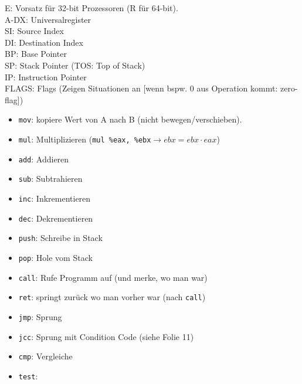 
E: Vorsatz für 32-bit Prozessoren (R für 64-bit).\\
A-DX: Universalregister\\
SI: Source Index\\
DI: Destination Index\\
BP: Base Pointer\\
SP: Stack Pointer (TOS: Top of Stack)\\
IP: Instruction Pointer\\
FLAGS: Flags (Zeigen Situationen an [wenn bspw. 0 aus Operation kommt: zero-flag])

\begin{itemize}
\item \lstinline`mov`: kopiere Wert von A nach B (nicht bewegen/verschieben). 
\item \lstinline`mul`: Multiplizieren (\lstinline`mul %eax, %ebx`$\to ebx = ebx \cdot eax$)
\item \lstinline`add`: Addieren
\item \lstinline`sub`: Subtrahieren
\item \lstinline`inc`: Inkrementieren
\item \lstinline`dec`: Dekrementieren
\item \lstinline`push`: Schreibe in Stack
\item \lstinline`pop`: Hole vom Stack
\item \lstinline`call`: Rufe Programm auf (und merke, wo man war)
\item \lstinline`ret`: springt zurück wo man vorher war (nach \lstinline`call`)
\item \lstinline`jmp`: Sprung
\item \lstinline`jcc`: Sprung mit Condition Code (siehe Folie 11)
\item \lstinline`cmp`:  Vergleiche
\item \lstinline`test`:
\end{itemize}

